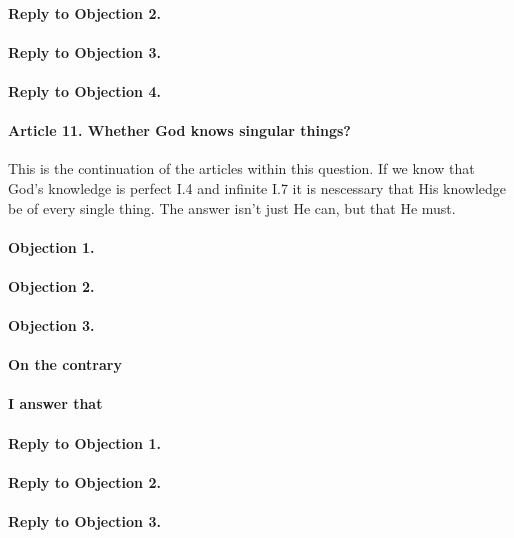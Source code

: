 \documentclass{ucetd}
\begin{document}
\paragraph{Reply to Objection 2.}
\paragraph{Reply to Objection 3.}
\paragraph{Reply to Objection 4.}

\paragraph{Article 11. Whether God knows singular things?}
This is the continuation of the articles within this question. If we know that God's knowledge is perfect I.4 and infinite I.7 it is nescessary that His knowledge be of every single thing. The answer isn't just He can, but that He must.
\paragraph{Objection 1.}
\paragraph{Objection 2.}
\paragraph{Objection 3.}
\paragraph{On the contrary}
\paragraph{I answer that}
\paragraph{Reply to Objection 1.}
\paragraph{Reply to Objection 2.}
\paragraph{Reply to Objection 3.}
\end{document}
